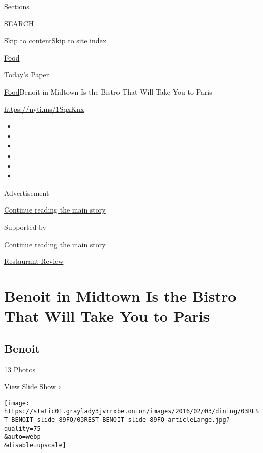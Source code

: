 Sections

SEARCH

\protect\hyperlink{site-content}{Skip to
content}\protect\hyperlink{site-index}{Skip to site index}

\href{https://www.nytimes3xbfgragh.onion/section/food}{Food}

\href{https://myaccount.nytimes3xbfgragh.onion/auth/login?response_type=cookie\&client_id=vi}{}

\href{https://www.nytimes3xbfgragh.onion/section/todayspaper}{Today's
Paper}

\href{/section/food}{Food}\textbar{}Benoit in Midtown Is the Bistro That
Will Take You to Paris

\url{https://nyti.ms/1SqxKnx}

\begin{itemize}
\item
\item
\item
\item
\item
\item
\end{itemize}

Advertisement

\protect\hyperlink{after-top}{Continue reading the main story}

Supported by

\protect\hyperlink{after-sponsor}{Continue reading the main story}

\href{/column/restaurant-review}{Restaurant Review}

\hypertarget{benoit-in-midtown-is-the-bistro-that-will-take-you-to-paris}{%
\section{Benoit in Midtown Is the Bistro That Will Take You to
Paris}\label{benoit-in-midtown-is-the-bistro-that-will-take-you-to-paris}}

\href{https://www.nytimes3xbfgragh.onion/slideshow/2016/02/03/dining/benoit.html}{}

\hypertarget{benoit}{%
\subsection{Benoit}\label{benoit}}

13 Photos

View Slide Show ›

\texttt{[image: https://static01.graylady3jvrrxbe.onion/images/2016/02/03/dining/03REST-BENOIT-slide-89FQ/03REST-BENOIT-slide-89FQ-articleLarge.jpg?quality=75\\\&auto=webp\\\&disable=upscale]}

